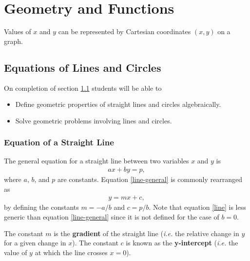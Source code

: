 \section{Geometry and Functions}

Values of $x$ and $y$ can be represented by Cartesian coordinates $(x,y)$ on a graph.

\subsection{Equations of Lines and Circles}
\label{sec:lincirc}

\begin{learningoutcomes} On completion of section \ref{sec:lincirc} students will be able to
\begin{itemize}
    \item Define geometric properties of straight lines and circles algebraically.
    \item Solve geometric problems involving lines and circles.
\end{itemize}
\end{learningoutcomes}

\subsubsection{Equation of a Straight Line}

The general equation for a straight line between two variables $x$ and $y$ is 
\begin{align}
    \label{line-general} ax + by = p,
\end{align}
where $a$, $b$, and $p$ are constants. Equation \eqref{line-general} is commonly rearranged as 
\begin{align}
    \label{line} y = mx + c,
\end{align}
by defining the constants $m = -a/b$ and $c = p/b$. Note that equation \eqref{line} is less generic than equation \eqref{line-general} since it is not defined for the case of $b=0$.

\begin{definition}
\label{def:line}
The constant $m$ is the \textbf{gradient} of the straight line (\textit{i.e.} the relative change in $y$ for a given change in $x$). The constant $c$ is known as the \textbf{y-intercept} (\textit{i.e.} the value of $y$ at which the line crosses $x=0$).
\end{definition}

